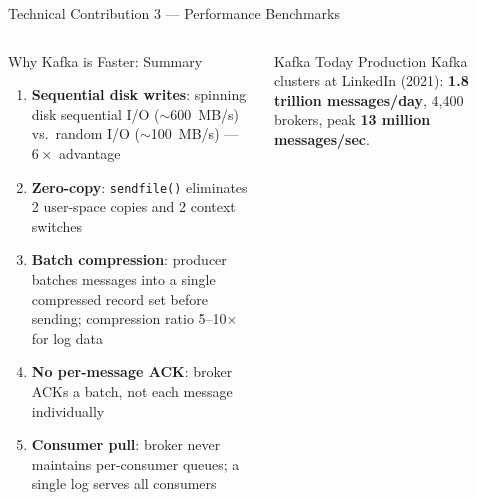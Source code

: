 \documentclass[aspectratio=169,10pt]{beamer}
\begin{document}
\begin{frame}{Technical Contribution 3 — Performance Benchmarks}
\begin{columns}[T]
      \begin{exampleblock}{Why Kafka is Faster: Summary}
        \begin{enumerate}
          \item \textbf{Sequential disk writes}: spinning disk
                sequential I/O ($\sim$600~MB/s) vs.\ random I/O
                ($\sim$100~MB/s) — $6\times$ advantage
          \item \textbf{Zero-copy}: \texttt{sendfile()} eliminates
                2 user-space copies and 2 context switches
          \item \textbf{Batch compression}: producer batches messages
                into a single compressed record set before sending;
                compression ratio 5--10$\times$ for log data
          \item \textbf{No per-message ACK}: broker ACKs a batch,
                not each message individually
          \item \textbf{Consumer pull}: broker never maintains
                per-consumer queues; a single log serves all consumers
        \end{enumerate}
      \end{exampleblock}
      \vspace{4pt}
      \begin{alertblock}{Kafka Today}
        Production Kafka clusters at LinkedIn (2021):
        \textbf{1.8 trillion messages/day}, 4{,}400 brokers,
        peak \textbf{13 million messages/sec}.
      \end{alertblock}
  \end{columns}
\end{frame}
\end{document}

